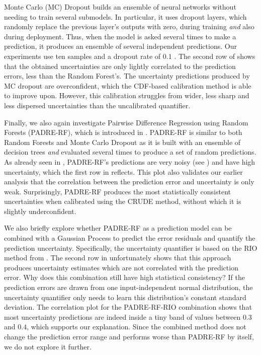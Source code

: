 \noindent Monte Carlo (MC) Dropout builds an ensemble of neural networks without needing to train several submodels. In particular, it uses dropout layers, which randomly replace the previous layer's outputs with zero, during training \textit{and} also during deployment. Thus, when the model is asked several times to make a prediction, it produces an ensemble of several independent predictions. Our experiments use ten samples and a dropout rate of $0.1$ \cite{mc-dropout-2016}. The second row of  shows that the obtained uncertainties are only lightly correlated to the prediction errors, less than the Random Forest's. The uncertainty predictions produced by MC dropout are overconfident, which the CDF-based calibration method is able to improve upon. However, this calibration struggles from wider, less sharp and less dispersed uncertainties than the uncalibrated quantifier.

\newpar Finally, we also again investigate Pairwise Difference Regression using Random Forests (PADRE-RF), which is introduced in . PADRE-RF is similar to both Random Forests and Monte Carlo Dropout as it is built with an ensemble of decision trees \textit{and} evaluated several times to produce a set of random predictions. As already seen in , PADRE-RF's predictions are very noisy (see ) and have high uncertainty, which the first row in  reflects. This plot also validates our earlier analysis that the correlation between the prediction error and uncertainty is only weak. Surprisingly, PADRE-RF produces the most statistically consistent uncertainties when calibrated using the CRUDE method, without which it is slightly underconfident.

We also briefly explore whether PADRE-RF as a prediction model can be combined with a Gaussian Process to predict the error residuals and quantify the prediction uncertainty. Specifically, the uncertainty quantifier is based on the RIO method from . The second row in  unfortunately shows that this approach produces uncertainty estimates which are not correlated with the prediction error. Why does this combination still have high statistical consistency? If the prediction errors are drawn from one input-independent normal distribution, the uncertainty quantifier only needs to learn this distribution's constant standard deviation. The correlation plot for the PADRE-RF-RIO combination shows that most uncertainty predictions are indeed inside a tiny band of values between $0.3$ and $0.4$, which supports our explanation. Since the combined method does not change the prediction error range and performs worse than PADRE-RF by itself, we do not explore it further.

